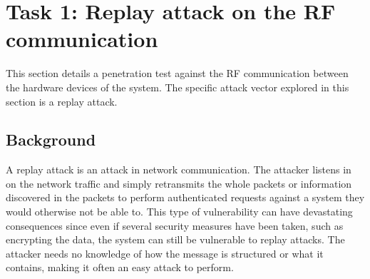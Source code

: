 \section{Task 1: Replay attack on the RF communication} \label{ch:pentesting:replay}
This section details a penetration test against the RF communication between the hardware devices of the system. The specific attack vector explored in this section is a replay attack.

\subsection{Background}
A replay attack is an attack in network communication. The attacker listens in on the network traffic and simply retransmits the whole packets or information discovered in the packets to perform authenticated requests against a system they would otherwise not be able to. This type of vulnerability can have devastating consequences since even if several security measures have been taken, such as encrypting the data, the system can still be vulnerable to replay attacks. The attacker needs no knowledge of how the message is structured or what it contains, making it often an easy attack to perform.


